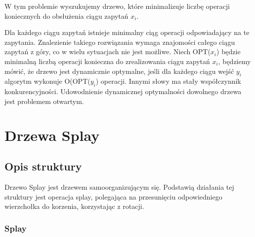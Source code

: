 \documentclass[declaration,shortabstract]{iithesis}
\begin{document}
W tym problemie wyszukujemy drzewo, które minimalizuje liczbę operacji koniecznych do obsłużenia ciągu zapytań \(x_i\).  

Dla każdego ciągu zapytań istnieje minimalny ciąg operacji odpowiadający na te zapytania. Znalezienie takiego rozwiązania wymaga znajomości całego ciągu zapytań z góry, co w wielu sytuacjach nie jest możliwe. Niech OPT(\(x_i\)) będzie minimalną liczbą operacji konieczna do zrealizowania ciągu zapytań \(x_i\), będziemy mówić, że drzewo jest dynamicznie optymalne, jeśli dla każdego ciągu wejść \(y_i\) algorytm wykonuje O(OPT(\(y_i\)) operacji. Innymi słowy ma stały współczynnik konkurencyjności. Udowodnienie dynamicznej optymalności dowolnego drzewa jest problemem otwartym.  

 

\chapter{Drzewa Splay}  

\section{Opis struktury} 

Drzewo Splay jest drzewem samoorganizującym się. Podstawią działania tej struktury jest operacja splay, polegająca na przesunięciu odpowiedniego wierzchołka do korzenia, korzystając z rotacji.  

\subsection{Splay} 
\end{document}
